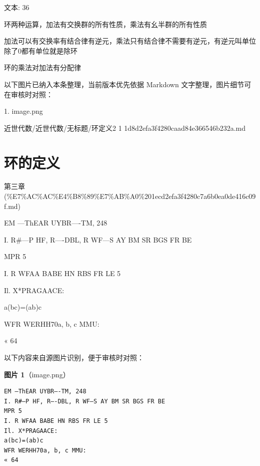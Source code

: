 \begin{definition}[环定义2.1]

文本: 36

环两种运算，加法有交换群的所有性质，乘法有幺半群的所有性质

加法可以有交换率有结合律有逆元，乘法只有结合律不需要有逆元，有逆元叫单位除了0都有单位就是除环

环的乘法对加法有分配律

\end{definition}

\begin{note}[关联图片]
以下图片已纳入本条整理，当前版本优先依据 Markdown 文字整理，图片细节可在审核时对照：

1. image.png\\

\end{note}

\begin{note}[来源路径]

近世代数/近世代数/无标题/环定义2 1 1d8d2efa3f4280caad84e366546b232a.md

\end{note}

\section*{环的定义}

\begin{note}[来源上级主题]

第三章 (\%E7\%AC\%AC\%E4\%B8\%89\%E7\%AB\%A0\%201ecd2efa3f4280c7a6b0ea0de416c09f.md)

\end{note}

\begin{definition}[环的定义]

EM —ThEAR UYBR—-TM, 248

I. R\#—P HF, R—-DBL, R WF—S AY BM SR BGS FR BE

MPR 5

I. R WFAA BABE HN RBS FR LE 5

Il. X*PRAGAACE:

a(bc)=(ab)c

WFR WERHH70a, b, c MMU:

« 64

\end{definition}

\begin{note}
以下内容来自源图片识别，便于审核时对照：

\textbf{图片 1}（image.png）
\begin{Verbatim}[fontsize=\small]
EM —ThEAR UYBR—-TM, 248
I. R#—P HF, R—-DBL, R WF—S AY BM SR BGS FR BE
MPR 5
I. R WFAA BABE HN RBS FR LE 5
Il. X*PRAGAACE:
a(bc)=(ab)c
WFR WERHH70a, b, c MMU:
« 64
\end{Verbatim}

\end{note}

